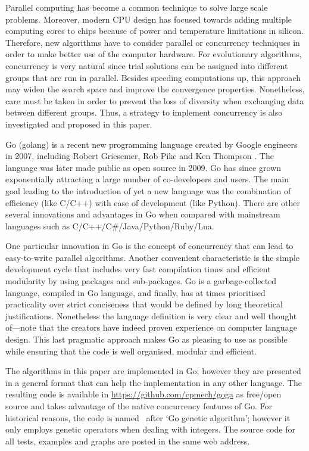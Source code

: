 \documentclass[final,5p,times,twocolumn]{elsarticle}
\begin{document}
Parallel computing has become a common technique to solve large scale problems. Moreover, modern CPU
design has focused towards adding multiple computing cores to chips because of power and temperature
limitations in silicon. Therefore, new algorithms have to consider parallel or concurrency
techniques in order to make better use of the computer hardware. For evolutionary algorithms,
concurrency is very natural since trial solutions can be assigned into different groups that are run
in parallel. Besides speeding computations up, this approach may widen the search space and improve
the convergence properties. Nonetheless, care must be taken in order to prevent the loss of
diversity when exchanging data between different groups. Thus, a strategy to implement concurrency
is also investigated and proposed in this paper.

Go (golang) is a recent new programming language created by Google engineers in 2007, including
Robert Griesemer, Rob Pike and Ken Thompson \cite{golang:16}. The language was later made public as
open source in 2009. Go has since grown exponentially attracting a large number of co-developers and
users. The main goal leading to the introduction of yet a new language was the combination of
efficiency (like C/C++) with ease of development (like Python). There are other several innovations
and advantages in Go when compared with mainstream languages such as C/C++/C\#/Java/Python/Ruby/Lua.

One particular innovation in Go is the concept of concurrency that can lead to easy-to-write
parallel algorithms. Another convenient characteristic is the simple development cycle that includes
very fast compilation times and efficient modularity by using packages and sub-packages. Go is a
garbage-collected language, compiled in Go language, and finally, has at times prioritised
practicality over strict conciseness that would be defined by long theoretical justifications.
Nonetheless the language definition is very clear and well thought of---note that the creators have
indeed proven experience on computer language design. This last pragmatic approach makes Go as
pleasing to use as possible while ensuring that the code is well organised, modular and efficient.

The algorithms in this paper are implemented in Go; however they are presented in a general format
that can help the implementation in any other language. The resulting code is available in
\url{https://github.com/cpmech/goga} as free/open source and takes advantage of the native
concurrency features of Go. For historical reasons, the code is named \goga~after `Go genetic
algorithm'; however it only employs genetic operators when dealing with integers. The source code
for all tests, examples and graphs are posted in the same web address.
\end{document}
